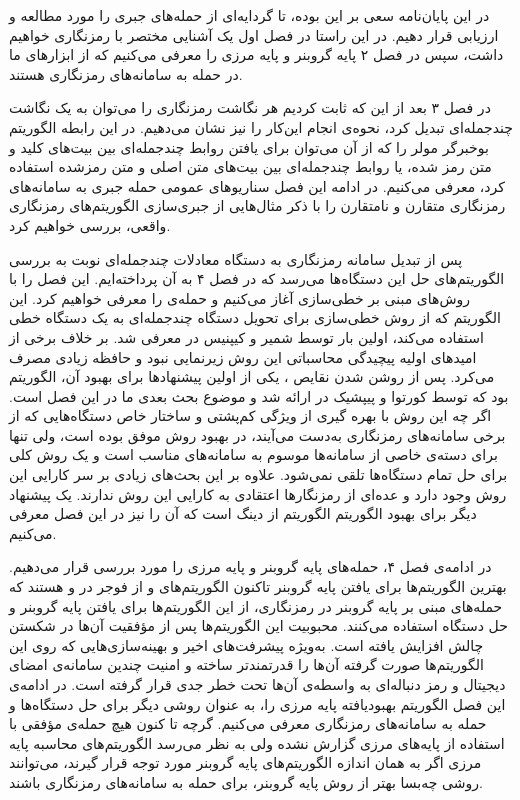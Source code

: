 در این پایان‌نامه سعی بر این بوده، تا گردایه‌ای از حمله‌های جبری را مورد مطالعه و ارزیابی قرار دهیم. در این راستا در فصل اول یک آشنایی مختصر با رمزنگاری خواهیم داشت، سپس در فصل ۲ پایه گروبنر و پایه مرزی را معرفی می‌کنیم که از ابزارهای ما در حمله به سامانه‌های رمزنگاری هستند.

در فصل ۳ بعد از این که ثابت کردیم هر نگاشت رمزنگاری را می‌توان به یک نگاشت چندجمله‌ای تبدیل کرد، نحوه‌ی انجام این‌کار را نیز نشان می‌دهیم. در این رابطه الگوریتم بوخبرگر مولر 
را که از آن می‌توان برای یافتن روابط چندجمله‌ای بین بیت‌های کلید و متن رمز شده، یا روابط چندجمله‌ای بین بیت‌های متن اصلی و متن رمزشده استفاده کرد، معرفی می‌کنیم. 
در ادامه این فصل سناریو‌های عمومی حمله جبری به سامانه‌های رمزنگاری متقارن و نامتقارن را با ذکر  مثال‌هایی از جبری‌سازی الگوریتم‌های رمزنگاری واقعی،  بررسی خواهیم کرد. 

پس از تبدیل سامانه‌ رمزنگاری به دستگاه معادلات  چند‌جمله‌ای نوبت به بررسی الگوریتم‌های حل‌ این دستگاه‌ها می‌رسد که در فصل ۴ به آن پرداخته‌ایم. این فصل را  با روش‌های مبنی بر خطی‌سازی آغاز می‌کنیم و حمله‌ی 
را معرفی خواهیم کرد. این الگوریتم که از روش  خطی‌سازی برای تحویل دستگاه چند‌جمله‌ای به یک دستگاه خطی استفاده می‌کند، اولین بار توسط شمیر
و 
کیپنیس
در 
\cite{kipnis1999cryptanalysis}
معرفی شد. بر خلاف برخی از امید‌های اولیه پیچیدگی محاسباتی این روش زیرنمایی نبود و حافظه‌ زیادی مصرف می‌کرد. پس از روشن شدن نقایص 
،
یکی از اولین پیشنهادها برای بهبود  آن، الگوریتم 
بود که توسط کورتوا
و پیپشیک
در 
\cite{courtois2002cryptanalysis}
ارائه شد و موضوع بحث بعدی ما در این فصل است. اگر چه این روش با بهره گیری از ویژگی کم‌پشتی و ساختار خاص دستگاه‌هایی که از برخی سامانه‌های رمزنگاری به‌دست می‌آیند، در بهبود روش 
موفق بوده است،  ولی تنها برای دسته‌ی خاصی از سامانه‌ها موسوم به سامانه‌های 
مناسب است و یک روش کلی برای حل تمام دستگاه‌ها تلقی نمی‌شود. علاوه بر این بحث‌های زیادی بر سر کارایی این روش وجود دارد و عده‌ای از رمزنگارها اعتقادی به کارایی این روش ندارند.  یک پیشنهاد دیگر برای بهبود الگوریتم 
الگوریتم 
از دینگ
است که آن را نیز در این فصل معرفی می‌کنیم.

در ادامه‌ی فصل ۴، حمله‌های پایه‌ گروبنر و پایه‌ مرزی را مورد بررسی قرار می‌دهیم. بهترین الگوریتم‌ها برای یافتن پایه‌ گروبنر تا‌کنون الگوریتم‌های 
و 
از فوجر 
در 
\cite{faugere1999new}
و
\cite{Faugere2002}
هستند که حمله‌های مبنی بر پایه گروبنر در رمزنگاری، از این الگوریتم‌ها برای یافتن پایه گروبنر و حل دستگاه استفاده می‌کنند. محبوبیت این الگوریتم‌‌ها پس از مؤفقیت آن‌ها در شکستن چالش 
افزایش یافته است. به‌ویژه پیشرفت‌های‌ اخیر و بهینه‌سازی‌هایی که روی این الگوریتم‌ها صورت گرفته آن‌ها را قدرتمند‌تر ساخته و امنیت چندین سامانه‌ی امضای دیجیتال و رمز دنباله‌ای به واسطه‌ی آن‌ها تحت خطر جدی قرار گرفته است. در ادامه‌ی این فصل الگوریتم بهبود‌یافته‌ پایه مرزی را، به عنوان روشی دیگر برای حل دستگاه‌ها و حمله به سامانه‌های رمزنگاری معرفی می‌کنیم. گرچه تا کنون هیچ حمله‌ی مؤفقی با استفاده از پایه‌های مرزی گزارش نشده ولی به نظر می‌رسد الگوریتم‌های محاسبه‌ پایه مرزی اگر به همان اندازه‌ الگوریتم‌های پایه گروبنر مورد توجه قرار گیرند، می‌توانند روشی چه‌بسا بهتر از روش پایه گروبنر،  برای حمله به سامانه‌های رمزنگاری باشند.  

